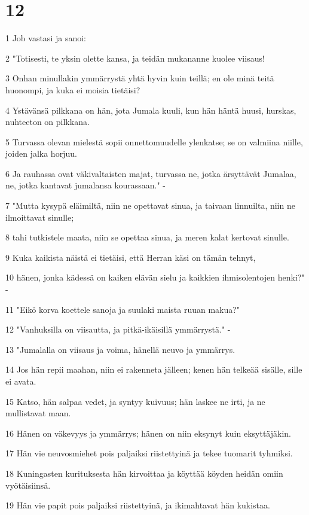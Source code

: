 \chapter{12}

\par 1 Job vastasi ja sanoi:
\par 2 "Totisesti, te yksin olette kansa, ja teidän mukananne kuolee viisaus!
\par 3 Onhan minullakin ymmärrystä yhtä hyvin kuin teillä; en ole minä teitä huonompi, ja kuka ei moisia tietäisi?
\par 4 Ystävänsä pilkkana on hän, jota Jumala kuuli, kun hän häntä huusi, hurskas, nuhteeton on pilkkana.
\par 5 Turvassa olevan mielestä sopii onnettomuudelle ylenkatse; se on valmiina niille, joiden jalka horjuu.
\par 6 Ja rauhassa ovat väkivaltaisten majat, turvassa ne, jotka ärsyttävät Jumalaa, ne, jotka kantavat jumalansa kourassaan." -
\par 7 "Mutta kysypä eläimiltä, niin ne opettavat sinua, ja taivaan linnuilta, niin ne ilmoittavat sinulle;
\par 8 tahi tutkistele maata, niin se opettaa sinua, ja meren kalat kertovat sinulle.
\par 9 Kuka kaikista näistä ei tietäisi, että Herran käsi on tämän tehnyt,
\par 10 hänen, jonka kädessä on kaiken elävän sielu ja kaikkien ihmisolentojen henki?" -
\par 11 "Eikö korva koettele sanoja ja suulaki maista ruuan makua?"
\par 12 "Vanhuksilla on viisautta, ja pitkä-ikäisillä ymmärrystä." -
\par 13 "Jumalalla on viisaus ja voima, hänellä neuvo ja ymmärrys.
\par 14 Jos hän repii maahan, niin ei rakenneta jälleen; kenen hän telkeää sisälle, sille ei avata.
\par 15 Katso, hän salpaa vedet, ja syntyy kuivuus; hän laskee ne irti, ja ne mullistavat maan.
\par 16 Hänen on väkevyys ja ymmärrys; hänen on niin eksynyt kuin eksyttäjäkin.
\par 17 Hän vie neuvosmiehet pois paljaiksi riistettyinä ja tekee tuomarit tyhmiksi.
\par 18 Kuningasten kurituksesta hän kirvoittaa ja köyttää köyden heidän omiin vyötäisiinsä.
\par 19 Hän vie papit pois paljaiksi riistettyinä, ja ikimahtavat hän kukistaa.
